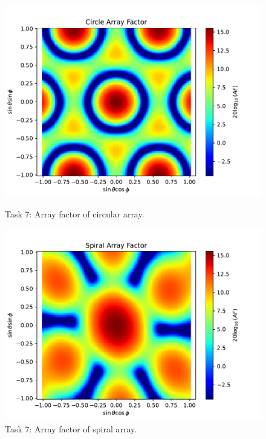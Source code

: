 \begin{figure}
    \centering
    \begin{minipage}{0.48\textwidth}
        \centering
        \includegraphics[width=1.0\textwidth]{graphics/t7/t7-rad-circ.pdf} %
        \caption{Task 7: Array factor of circular array.}
        \label{fig:t7-rad-circ}
    \end{minipage}\hfill
    \begin{minipage}{0.48\textwidth}
        \centering
        \includegraphics[width=1\textwidth]{graphics/t7/t7-rad-spir.pdf} %
        \caption{Task 7: Array factor of spiral array.}
        \label{fig:t7-rad-spir}
    \end{minipage}
\end{figure}

